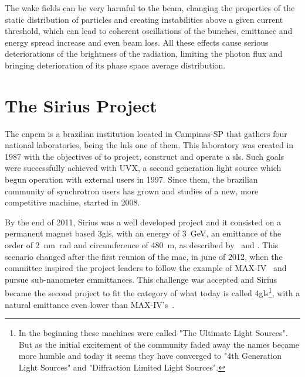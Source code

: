     The wake fields can be very harmful to the beam, changing the properties of the static distribution of particles and creating instabilities above a given current threshold, which can lead to coherent oscillations of the bunches, emittance and energy spread increase and even beam loss. All these effects cause serious deteriorations of the brightness of the radiation, limiting the photon flux and bringing deterioration of its phase space average distribution.

\section{The Sirius Project}

  	The \gls{cnpem} is a brazilian institution located in Campinas-SP that gathers four national laboratories, being the \gls{lnls} one of them. This laboratory was created in 1987 with the objectives of to project, construct and operate a \gls{sls}. Such goals were successfully achieved with UVX, a second generation light source which begun operation with external users in 1997. Since them, the brazilian community of synchrotron users has grown and studies of a new, more competitive machine, started in 2008.

    By the end of 2011, Sirius was a well developed project and it consisted on a permanent magnet based \gls{3gls}, with an energy of \SI{3}{\giga\electronvolt}, an emittance of the order of \SI{2}{\nano\meter\radian} and circumference of \SI{480}{\meter}, as described by~ and . This scenario changed after the first reunion of the \gls{mac}, in june of 2012, when the committee inspired the project leaders to follow the example of MAX-IV~\cite{Leemann2009} and pursue sub-nanometer emmittances. This challenge was accepted and Sirius became the second project to fit the category of what today is called \gls{4gls}\footnote{In the beginning these machines were called "The Ultimate Light Sources". But as the initial excitement of the community faded away the names became more humble and today it seems they have converged to "4th Generation Light Sources" and "Diffraction Limited Light Sources".}, with a natural emittance even lower than MAX-IV's~\cite{Liu2013}.

